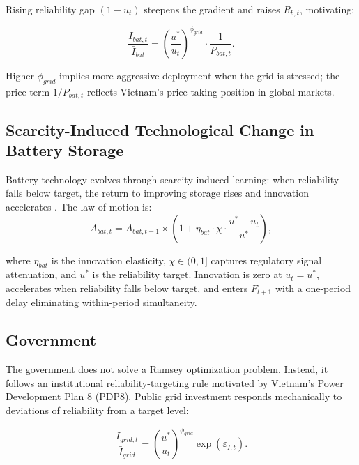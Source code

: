 	Rising reliability gap $(1-u_t)$ steepens the gradient and raises $R_{b,t}$, motivating:

	\begin{equation}
		\frac{I_{bat,t}}{\bar{I}_{bat}} = \left(\frac{u^*}{u_t}\right)^{\phi_{grid}} \cdot \frac{1}{P_{bat,t}}
		\label{eq:battery_investment}.
	\end{equation}
	
	Higher $\phi_{grid}$ implies more aggressive deployment when the grid is stressed; the price term $1/P_{bat,t}$ reflects Vietnam's price-taking position in global markets.
	
	\subsection{Scarcity-Induced Technological Change in Battery Storage}
	
	Battery technology evolves through scarcity-induced learning: when reliability falls below target, the return to improving storage rises and innovation accelerates \citep{hicks1932, acemoglu2002}. The law of motion is:
	\begin{equation}
		A_{bat,t} = A_{bat,t-1} \times \left(1 + \eta_{bat} \cdot \chi \cdot \frac{u^* - u_t}{u^*}\right)
		\label{eq:learning_by_doing},
	\end{equation}
	
where $\eta_{bat}$ is the innovation elasticity, $\chi\in(0,1]$ captures regulatory signal attenuation, and $u^*$ is the reliability target. Innovation is zero at $u_t=u^*$, accelerates when reliability falls below target, and enters $F_{t+1}$ with a one-period delay eliminating within-period simultaneity.

\subsection{Government} \label{sec:government}
	
	The government does not solve a Ramsey optimization problem. Instead, it follows an institutional reliability-targeting rule motivated by Vietnam's Power Development Plan 8 (PDP8). Public grid investment responds mechanically to deviations of reliability from a target level:
	
	\begin{equation}
		\frac{I_{grid,t}}{\bar{I}_{grid}} =
		\left(\frac{u^*}{u_t}\right)^{\phi_{grid}}
		\exp(\varepsilon_{I,t})
		\label{eq:grid_investment_rule}.
	\end{equation}
	
